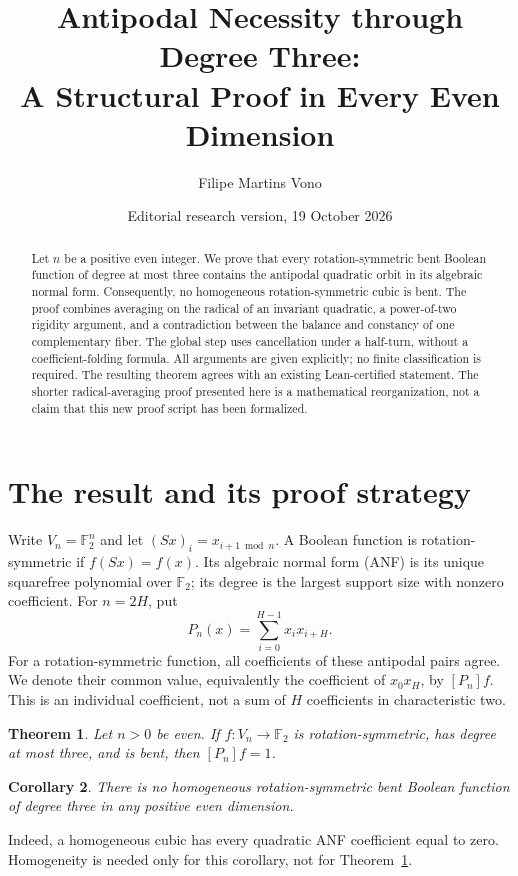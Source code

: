 \documentclass[11pt,a4paper]{article}
\title{Antipodal Necessity through Degree Three:\\A Structural Proof in Every Even Dimension}
\author{Filipe Martins Vono}
\date{Editorial research version, 19 October 2026}
\newcommand{\F}{\mathbb F_2}
\newtheorem{theorem}{Theorem}
\newtheorem{corollary}[theorem]{Corollary}
\begin{document}
\maketitle
\begin{abstract}
Let $n$ be a positive even integer. We prove that every rotation-symmetric bent Boolean function of degree at most three contains the antipodal quadratic orbit in its algebraic normal form. Consequently, no homogeneous rotation-symmetric cubic is bent. The proof combines averaging on the radical of an invariant quadratic, a power-of-two rigidity argument, and a contradiction between the balance and constancy of one complementary fiber. The global step uses cancellation under a half-turn, without a coefficient-folding formula. All arguments are given explicitly; no finite classification is required. The resulting theorem agrees with an existing Lean-certified statement. The shorter radical-averaging proof presented here is a mathematical reorganization, not a claim that this new proof script has been formalized.
\end{abstract}

\section{The result and its proof strategy}
Write $V_n=\F^n$ and let $(Sx)_i=x_{i+1\bmod n}$. A Boolean function is rotation-symmetric if $f(Sx)=f(x)$. Its algebraic normal form (ANF) is its unique squarefree polynomial over $\F$; its degree is the largest support size with nonzero coefficient. For $n=2H$, put
\[
 P_n(x)=\sum_{i=0}^{H-1}x_ix_{i+H}.
\]
For a rotation-symmetric function, all coefficients of these antipodal pairs agree. We denote their common value, equivalently the coefficient of $x_0x_H$, by $[P_n]f$. This is an individual coefficient, not a sum of $H$ coefficients in characteristic two.

\begin{theorem}\label{thm:main}
Let $n>0$ be even. If $f:V_n\to\F$ is rotation-symmetric, has degree at most three, and is bent, then $[P_n]f=1$.
\end{theorem}

\begin{corollary}\label{cor:cubic}
There is no homogeneous rotation-symmetric bent Boolean function of degree three in any positive even dimension.
\end{corollary}
Indeed, a homogeneous cubic has every quadratic ANF coefficient equal to zero. Homogeneity is needed only for this corollary, not for Theorem~\ref{thm:main}.
\end{document}
